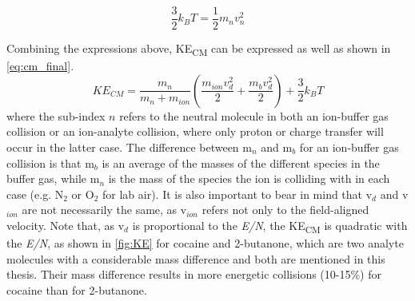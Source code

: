 \begin{equation}
\label{eq:KT}
\frac{3}{2}k_B T = \frac{1}{2}m_{n}v_{n}^2
\end{equation}

Combining the expressions above, KE\textsubscript{CM} can be expressed as well as shown in \autoref{eq:cm_final}.
\begin{equation}
\label{eq:cm_final}
KE_{CM} = \frac{m_n}{m_n + m_{ion}} \left( \frac{m_{ion}v_d^2}{2} + \frac{m_{b}v_d^2}{2}\right) + \frac{3}{2}k_BT
\end{equation}
%
where the sub-index $n$ refers to the neutral molecule in both an ion-buffer gas collision or an ion-analyte collision, where only proton or charge transfer will occur in the latter case.
The difference between m$_n$ and m$_b$ for an ion-buffer gas collision is that m$_b$ is an average of the masses of the different species in the buffer gas, while m$_n$ is the mass of the species the ion is colliding with in each case (e.g. N$_2$ or O$_2$ for lab air).
It is also important to bear in mind that v$_d$ and v$_{ion}$ are not necessarily the same, as v$_{ion}$ refers not only to the field-aligned velocity.
Note that, as v$_d$ is proportional to the \textit{E/N}, the KE\textsubscript{CM} is quadratic with the \textit{E/N}, as shown in \autoref{fig:KE} for cocaine and 2-butanone, which are two analyte molecules with a considerable mass difference and both are mentioned in this thesis. Their mass difference results in more energetic collisions (10-15\%) for cocaine than for 2-butanone.





